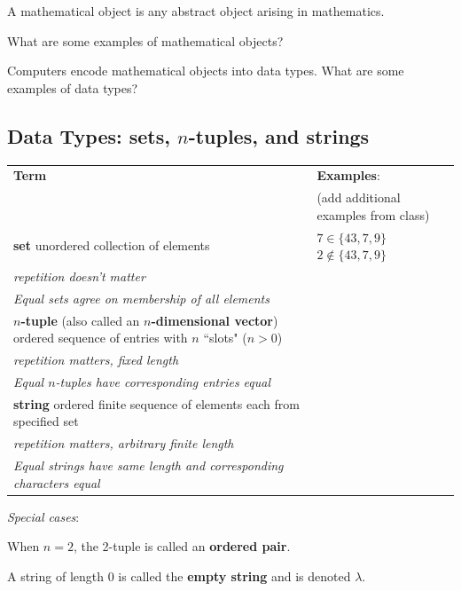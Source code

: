 \documentclass[12pt, oneside]{article}
\begin{document}
A mathematical object is any abstract object arising in mathematics.

What are some examples of mathematical objects?

\vfill

Computers encode mathematical objects into data types. What are some examples of data types?

\vfill

\newpage

\subsection*{Data Types: sets, $n$-tuples, and strings}


\begin{center}
    \begin{tabular}{p{4.6in}p{2.6in}}
    {\bf  Term} & {\bf Examples}:\\
    &  (add additional examples from class)\\
    \hline 
    {\bf set} \newline
    unordered collection of elements & $7 \in \{43, 7, 9 \}$ \qquad $2 \notin \{43, 7, 9 \}$ \\
    {\it repetition doesn't matter} & \\
    {\it Equal sets agree on membership of all elements}& \\
    \hline
    {\bf $n$-tuple} (also called an {\bf $n$-dimensional vector}) \newline
    ordered sequence of entries with $n$ ``slots" ($n >0$) & \\
    {\it repetition matters, fixed length} &\\
    {\it Equal $n$-tuples have corresponding entries equal}& \\
    \hline
    {\bf string} \newline
    ordered finite sequence of elements each from specified
    set & \\
    {\it repetition matters, arbitrary finite length} &\\
    {\it Equal strings have same length and corresponding characters equal}
    \end{tabular}
\end{center}

{\it Special cases}: 

When $n=2$, the 2-tuple is called an {\bf ordered pair}.

A string of length $0$ is called the {\bf empty string} and is denoted $\lambda$.
\end{document}
